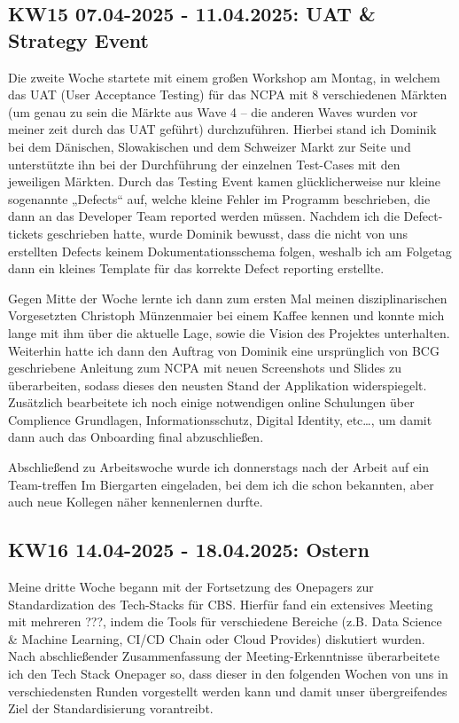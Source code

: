 \subsection{KW15 07.04-2025 - 11.04.2025: UAT \& Strategy Event}
Die zweite Woche startete mit einem großen Workshop am Montag, in welchem das UAT (User Acceptance Testing) für das NCPA mit 8 verschiedenen Märkten (um genau zu sein die Märkte aus Wave 4 – die anderen Waves wurden vor meiner zeit durch das UAT geführt) durchzuführen. 
Hierbei stand ich Dominik bei dem Dänischen, Slowakischen und dem Schweizer Markt zur Seite und unterstützte ihn bei der Durchführung der einzelnen Test-Cases mit den jeweiligen Märkten. 
Durch das Testing Event kamen glücklicherweise nur kleine sogenannte „Defects“ auf, welche kleine Fehler im Programm beschrieben, die dann an das Developer Team reported werden müssen. 
Nachdem ich die Defect-tickets geschrieben hatte, wurde Dominik bewusst, dass die nicht von uns erstellten Defects keinem Dokumentationsschema folgen, weshalb ich am Folgetag dann ein kleines Template für das korrekte Defect reporting erstellte.

Gegen Mitte der Woche lernte ich dann zum ersten Mal meinen disziplinarischen Vorgesetzten Christoph Münzenmaier bei einem Kaffee kennen und konnte mich lange mit ihm über die aktuelle Lage, sowie die Vision des Projektes unterhalten. 
Weiterhin hatte ich dann den Auftrag von Dominik eine ursprünglich von BCG geschriebene Anleitung zum NCPA mit neuen Screenshots und Slides zu überarbeiten, sodass dieses den neusten Stand der Applikation widerspiegelt. 
Zusätzlich bearbeitete ich noch einige notwendigen online Schulungen über Complience Grundlagen, Informationsschutz, Digital Identity, etc…, um damit dann auch das Onboarding final abzuschließen.

Abschließend zu Arbeitswoche wurde ich donnerstags nach der Arbeit auf ein Team-treffen Im Biergarten eingeladen, bei dem ich die schon bekannten, aber auch neue Kollegen näher kennenlernen durfte.


\subsection{KW16 14.04-2025 - 18.04.2025: Ostern}
Meine dritte Woche begann mit der Fortsetzung des Onepagers zur Standardization des Tech-Stacks für CBS. 
Hierfür fand ein extensives Meeting mit mehreren ???, indem die Tools für verschiedene Bereiche (z.B. Data Science \& Machine Learning, CI/CD Chain oder Cloud Provides) diskutiert wurden. 
Nach abschließender Zusammenfassung der Meeting-Erkenntnisse überarbeitete ich den Tech Stack Onepager so, dass dieser in den folgenden Wochen von uns in verschiedensten Runden vorgestellt werden kann und damit unser übergreifendes Ziel der Standardisierung vorantreibt.

